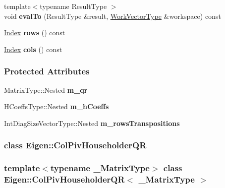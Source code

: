 \begin{DoxyCompactItemize}
\item 
\mbox{\label{group___q_r___module_aeca3ef83807e4dd6b4fdc73ac20dc000}} 
{\footnotesize template$<$typename Result\+Type $>$ }\\void {\bfseries eval\+To} (Result\+Type \&result, \hyperlink{group___core___module_class_eigen_1_1_matrix}{Work\+Vector\+Type} \&workspace) const
\item 
\mbox{\label{group___q_r___module_a33656ee221422a3800edf363c72994d4}} 
\hyperlink{namespace_eigen_a62e77e0933482dafde8fe197d9a2cfde}{Index} {\bfseries rows} () const
\item 
\mbox{\label{group___q_r___module_ada880345139442a6e5a51ccd4dd2bf09}} 
\hyperlink{namespace_eigen_a62e77e0933482dafde8fe197d9a2cfde}{Index} {\bfseries cols} () const
\end{DoxyCompactItemize}
\subsubsection*{Protected Attributes}
\begin{DoxyCompactItemize}
\item 
\mbox{\label{group___q_r___module_a52bad57f1b6f4e9e59435556575772ca}} 
Matrix\+Type\+::\+Nested {\bfseries m\+\_\+qr}
\item 
\mbox{\label{group___q_r___module_a3518abc98f07cff4e7a3c7b38f226d9e}} 
H\+Coeffs\+Type\+::\+Nested {\bfseries m\+\_\+h\+Coeffs}
\item 
\mbox{\label{group___q_r___module_ae75bac7d6c6b5d0df7da8d0f9cf8556e}} 
Int\+Diag\+Size\+Vector\+Type\+::\+Nested {\bfseries m\+\_\+rows\+Transpositions}
\end{DoxyCompactItemize}
\label{class_eigen_1_1_col_piv_householder_q_r}
\subsubsection{class Eigen\+:\+:Col\+Piv\+Householder\+QR}
\subsubsection*{template$<$typename \+\_\+\+Matrix\+Type$>$\newline
class Eigen\+::\+Col\+Piv\+Householder\+Q\+R$<$ \+\_\+\+Matrix\+Type $>$}

